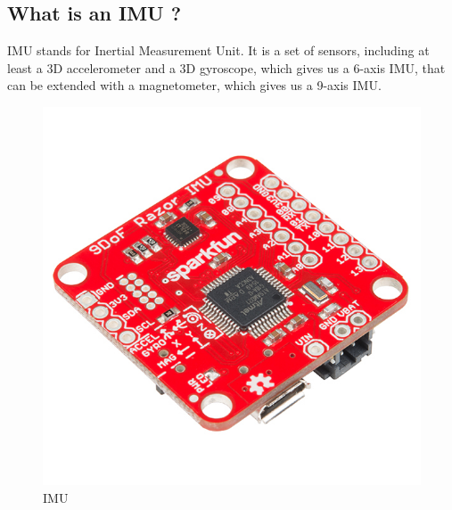 \documentclass[a4paper,10pt]{article}
\begin{document}
\subsection{What is an IMU ?}
IMU stands for Inertial Measurement Unit. It is a set of sensors, including at least a 3D accelerometer and a 3D gyroscope, which gives us a 6-axis IMU, that can be extended with a magnetometer, which gives us a 9-axis IMU. 
\begin{figure}[h]
\centering
  \includegraphics[width=\linewidth, angle=0, scale=0.2]{./images/IMU.jpg}
  \caption{IMU}
\end{figure}
\end{document}
